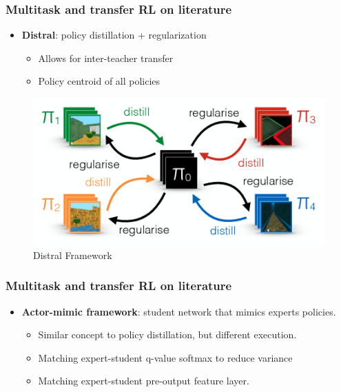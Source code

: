 \documentclass{beamer}
\theoremstyle{remark}
\theoremstyle{plain}
\begin{document}
 \begin{frame}
  \frametitle{Multitask and transfer RL on literature}
  \begin{itemize}
      \item \textbf{Distral}: policy distillation + regularization \cite{Teh2017Distral:Learning}
      \begin{itemize}
          \item Allows for inter-teacher transfer 
          \item Policy centroid of all policies
      \end{itemize}
  \end{itemize}
  \begin{figure}
      \centering
      \includegraphics[scale=0.2]{figs/distral.png}
      \caption{Distral Framework}
      \label{fig:my_label}
  \end{figure}
 \end{frame}
 
\begin{frame}
  \frametitle{Multitask and transfer RL on literature}
\begin{itemize}
    \item \textbf{Actor-mimic framework}: student network that mimics experts policies. 
    \begin{itemize}
        \item Similar concept to policy distillation, but different execution.
        \item Matching expert-student q-value softmax to reduce variance
        \item Matching expert-student pre-output feature layer.
    \end{itemize} 
\end{itemize}
 \end{frame}
 
\end{document}
